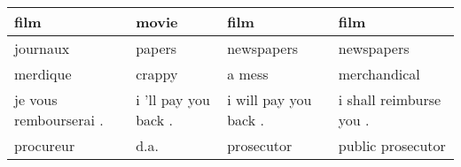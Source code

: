 \documentclass[11pt,a4paper]{article}
\begin{document}
\begin{table*}[]
\begin{tabular}{|p{3.5cm}|p{3.5cm}|p{3.5cm}|p{3.5cm}|}
film                                                                                                                                              & movie                                                                                                                        & film                                                                                                                                                & film                                                                                                                                              \\ \hline
journaux                                                                                                                                          & papers                                                                                                                       & newspapers                                                                                                                                          & newspapers                                                                                                                                        \\ \hline
merdique                                                                                                                                          & crappy                                                                                                                       & a mess                                                                                                                                              & merchandical                                                                                                                                      \\ \hline
je vous rembourserai .                                                                                                                            & i 'll pay you back .                                                                                                         & i will pay you back .                                                                                                                               & i shall reimburse you .                                                                                                                           \\ \hline
procureur                                                                                                                                         & d.a.                                                                                                                         & prosecutor                                                                                                                                          & public prosecutor                                                                                                                                 \\ \hline

\end{tabular}
\end{table*}
\end{document}

